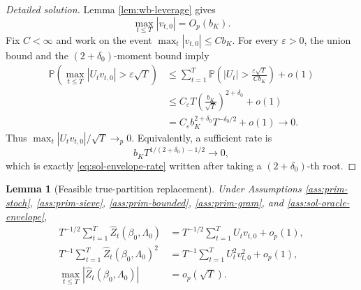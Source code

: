 \documentclass[12pt]{article}
\numberwithin{equation}{section}
\newtheorem{lemma}{Lemma}
\theoremstyle{definition}
\newcommand{\Pp}{\mathbb P}
\begin{document}
\begin{proof}[Detailed solution]
Lemma \ref{lem:wb-leverage} gives
\[
    \max_{t\leq T}|v_{t,0}|=O_p(b_K).
\]
Fix \(C<\infty\) and work on the event
\(\max_t|v_{t,0}|\leq Cb_K\).  For every \(\varepsilon>0\), the union bound
and the \((2+\delta_0)\)-moment bound imply
\begin{align*}
    \Pp\left(
      \max_{t\leq T}|U_tv_{t,0}|>\varepsilon\sqrt T
    \right)
    &\leq
      \sum_{t=1}^T
      \Pp\left(
        |U_t|>\frac{\varepsilon\sqrt T}{Cb_K}
      \right)+o(1)\\
    &\leq
      C_\varepsilon T
      \left(\frac{b_K}{\sqrt T}\right)^{2+\delta_0}+o(1)\\
    &=C_\varepsilon b_K^{2+\delta_0}T^{-\delta_0/2}+o(1)
      \longrightarrow0.
\end{align*}
Thus \(\max_t|U_tv_{t,0}|/\sqrt T\to_p0\).  Equivalently, a sufficient rate
is
\[
    b_KT^{1/(2+\delta_0)-1/2}\to0,
\]
which is exactly \eqref{eq:sol-envelope-rate} written after taking a
\((2+\delta_0)\)-th root.
\end{proof}


\begin{lemma}[Feasible true-partition replacement]
\label{lem:wb-feasible-replacement}
Under Assumptions \ref{ass:prim-stoch}, \ref{ass:prim-sieve},
\ref{ass:prim-bounded}, \ref{ass:prim-gram}, and
\ref{ass:sol-oracle-envelope},
\begin{align}
    T^{-1/2}\sum_{t=1}^T\widehat Z_t(\beta_0,\Lambda_0)
    &=
    T^{-1/2}\sum_{t=1}^TU_tv_{t,0}+o_p(1),
    \\
    T^{-1}\sum_{t=1}^T\widehat Z_t(\beta_0,\Lambda_0)^2
    &=
    T^{-1}\sum_{t=1}^TU_t^2v_{t,0}^2+o_p(1),
    \\
    \max_{t\leq T}|\widehat Z_t(\beta_0,\Lambda_0)|
    &=o_p(\sqrt T).
\end{align}
\end{lemma}
\end{document}
